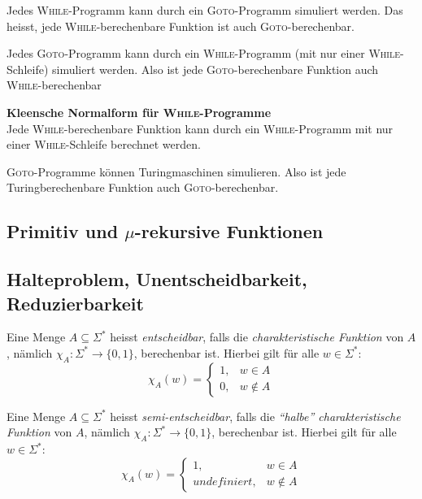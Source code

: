 \documentclass{scrartcl}
\begin{document}
\begin{shaded}
    Jedes \textsc{While}-Programm kann durch ein \textsc{Goto}-Programm simuliert werden. Das heisst, jede \textsc{While}-berechenbare Funktion ist auch \textsc{Goto}-berechenbar.
\end{shaded}

\begin{shaded}
    Jedes \textsc{Goto}-Programm kann durch ein \textsc{While}-Programm (mit nur einer \textsc{While}-Schleife) simuliert werden. Also ist jede \textsc{Goto}-berechenbare Funktion auch \textsc{While}-berechenbar
\end{shaded}

\begin{shaded}
    \textbf{Kleensche Normalform für \textsc{While}-Programme} \\
    Jede \textsc{While}-berechenbare Funktion kann durch ein \textsc{While}-Programm mit nur einer \textsc{While}-Schleife berechnet werden.
\end{shaded}

\begin{shaded}
    \textsc{Goto}-Programme können Turingmaschinen simulieren. Also ist jede Turingberechenbare Funktion auch \textsc{Goto}-berechenbar.
\end{shaded}
\begin{center}

\end{center}

\subsection*{Primitiv und $\mu$-rekursive Funktionen}

\subsection*{Halteproblem, Unentscheidbarkeit, Reduzierbarkeit}

\begin{shaded}
    Eine Menge $A\subseteq\Sigma^*$ heisst \emph{entscheidbar}, falls die \emph{charakteristische Funktion} von $A$, nämlich $\chi_A:\Sigma^*\to\{0,1\}$, berechenbar ist. Hierbei gilt für alle $w\in\Sigma^*$:
    \[
    \chi_A(w)=
    \begin{cases}
        1, & w\in A \\
        0, & w\not\in A
    \end{cases}
    \]

    Eine Menge $A\subseteq\Sigma^*$ heisst \emph{semi-entscheidbar}, falls die \emph{"`halbe"' charakteristische Funktion} von $A$, nämlich $\chi_A:\Sigma^*\to\{0,1\}$, berechenbar ist. Hierbei gilt für alle $w\in\Sigma^*$:
    \[
    \chi_A(w)=
    \begin{cases}
        1, & w\in A \\
        undefiniert, & w\not\in A
    \end{cases}
    \]
\end{shaded}
\end{document}
